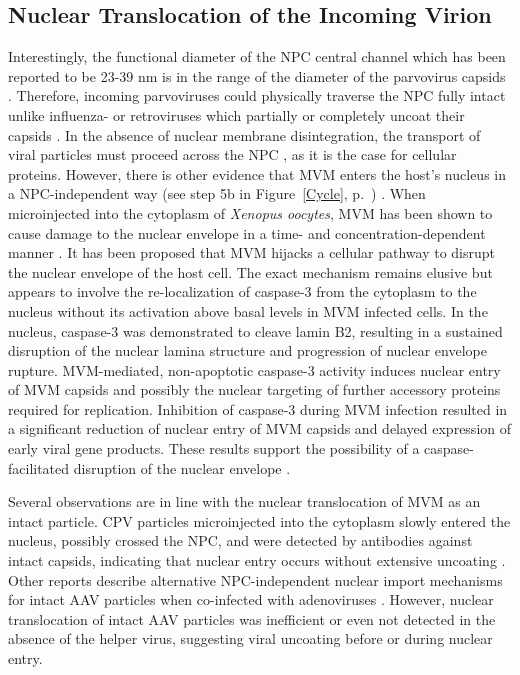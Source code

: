\subsection{Nuclear Translocation of the Incoming Virion}
Interestingly, the functional diameter of the NPC central channel which has been reported to be 23-39 nm \cite{pmid11854401, pmid2450095} is in the range of the diameter of the parvovirus capsids \cite{NPC}. Therefore, incoming parvoviruses could physically traverse the NPC fully intact unlike influenza- or retroviruses which partially or completely uncoat their capsids \cite{pmid10848617, pmid11389849, pmid8970960, pmid11031249, pmid9891810}. In the absence of nuclear membrane disintegration, the transport of viral particles must proceed across the NPC \cite{pmid10801463, pmid10395558, pmid11448991}, as it is the case for cellular proteins. However, there is other evidence that MVM enters the host's nucleus in a NPC-independent way (see step 5b in Figure~\ref{Cycle}, p.~\pageref{Cycle}) \cite{pmid17030854}. When microinjected into the cytoplasm of \textit{Xenopus oocytes}, MVM has been shown to cause damage to the nuclear envelope in a time- and concentration-dependent manner \cite{pmid16298969}. It has been proposed that MVM hijacks a cellular pathway to disrupt the nuclear envelope of the host cell. The exact mechanism remains elusive but appears to involve the re-localization of caspase-3 from the cytoplasm to the nucleus without its activation above basal levels in MVM infected cells. In the nucleus, caspase-3 was demonstrated to cleave lamin B2, resulting in a sustained disruption of the nuclear lamina structure and progression of nuclear envelope rupture. MVM-mediated, non-apoptotic caspase-3 activity induces nuclear entry of MVM capsids and possibly the nuclear targeting of further accessory proteins required for replication. Inhibition of caspase-3 during MVM infection resulted in a significant reduction of nuclear entry of MVM capsids and delayed expression of early viral gene products. These results support the possibility of a caspase-facilitated disruption of the nuclear envelope \cite{pmid21367902}.  


Several observations are in line with the nuclear translocation of MVM as an intact particle. CPV particles microinjected into the cytoplasm slowly entered the nucleus, possibly crossed the NPC, and were detected by antibodies against intact capsids, indicating that nuclear entry occurs without extensive uncoating \cite{pmid12970411, pmid10775624}. Other reports describe alternative NPC-independent nuclear import mechanisms for intact AAV particles when co-infected with adenoviruses \cite{pmid11592830, pmid12388712}. However, nuclear translocation of intact AAV particles was inefficient \cite{pmid16140755, pmid10684294, pmid11729319} or even not detected \cite{pmid16956943} in the absence of the helper virus, suggesting viral uncoating before or during nuclear entry. 

